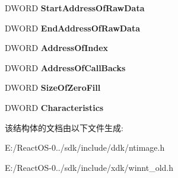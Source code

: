 \begin{DoxyCompactItemize}
D\+W\+O\+RD {\bfseries Start\+Address\+Of\+Raw\+Data}
\item 
\mbox{\label{struct___i_m_a_g_e___t_l_s___d_i_r_e_c_t_o_r_y32_aff760067d4ededf860bb717d4de97745}} 
D\+W\+O\+RD {\bfseries End\+Address\+Of\+Raw\+Data}
\item 
\mbox{\label{struct___i_m_a_g_e___t_l_s___d_i_r_e_c_t_o_r_y32_a45bba3580baa7a89ec66ca4aa29cdc3b}} 
D\+W\+O\+RD {\bfseries Address\+Of\+Index}
\item 
\mbox{\label{struct___i_m_a_g_e___t_l_s___d_i_r_e_c_t_o_r_y32_ac2b279a00258cd0599dbb88e1f086d82}} 
D\+W\+O\+RD {\bfseries Address\+Of\+Call\+Backs}
\item 
\mbox{\label{struct___i_m_a_g_e___t_l_s___d_i_r_e_c_t_o_r_y32_aa9746f752a09d2c5cace07a133a676fd}} 
D\+W\+O\+RD {\bfseries Size\+Of\+Zero\+Fill}
\item 
\mbox{\label{struct___i_m_a_g_e___t_l_s___d_i_r_e_c_t_o_r_y32_a8428d0a94518288a8ae357f2be87052f}} 
D\+W\+O\+RD {\bfseries Characteristics}
\end{DoxyCompactItemize}


该结构体的文档由以下文件生成\+:\begin{DoxyCompactItemize}
\item 
E\+:/\+React\+O\+S-\/0../sdk/include/ddk/ntimage.\+h\item 
E\+:/\+React\+O\+S-\/0../sdk/include/xdk/winnt\+\_\+old.\+h\end{DoxyCompactItemize}
